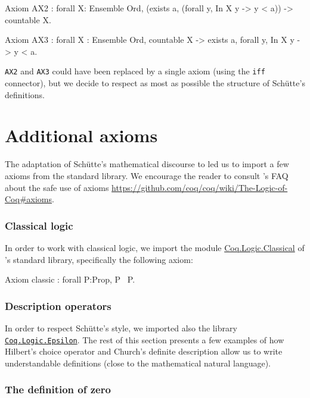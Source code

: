 \begin{Coqsrc}
Axiom AX2 : forall X: Ensemble Ord, 
   (exists a,  (forall y, In X y -> y < a)) ->
   countable X.

Axiom AX3 : forall X : Ensemble Ord,
              countable X -> 
              exists a,  forall y, In X y -> y < a.
\end{Coqsrc}

\texttt{AX2} and \texttt{AX3} could have been replaced by a single axiom (using the \texttt{iff} connector), but we decide to respect as most as possible the structure of Schütte's definitions.

\section{Additional  axioms}

The adaptation of Schütte's mathematical discourse to \coq{} led us to
import a few axioms from the standard library. We encourage the reader to consult \coq{}'s FAQ about the safe use of axioms
 \url{https://github.com/coq/coq/wiki/The-Logic-of-Coq#axioms}.

\subsubsection{Classical logic}

In order to work with classical logic, we import the module
\href{https://coq.inria.fr/distrib/current/stdlib/Coq.Logic.Classical.html}{Coq.Logic.Classical}  of \coq{}'s standard library, specifically the following axiom:

\begin{Coqsrc}
 Axiom classic : forall P:Prop, P \/ ~P.
\end{Coqsrc}


\subsubsection{Description operators}

In order to respect Schütte's style, we imported also the library 
\href{https://coq.inria.fr/distrib/current/stdlib/Coq.Logic.Epsilon.html}{\texttt{Coq.Logic.Epsilon}}.  The rest of this section presents a few examples of
how Hilbert's choice operator and Church's definite description allow us
 to write understandable definitions (close to the mathematical natural language).


\subsubsection{The definition of zero}

